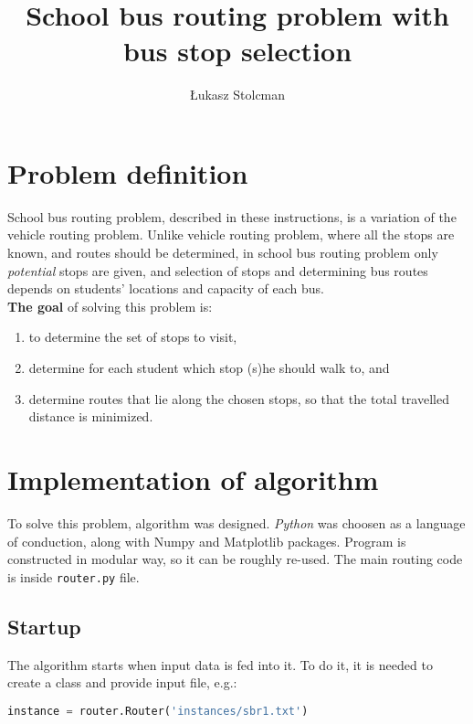 \documentclass [a4paper, 12pt]{article}
\author {Łukasz Stolcman}
\title {School bus routing problem with bus stop selection}
\begin{document}
\maketitle

\section{Problem definition}
School bus routing problem, described in these instructions, is a variation of the vehicle routing problem. Unlike vehicle routing problem, where all the stops are known, and routes should be determined, in school bus routing problem only \textit{potential} stops are given, and selection of stops and determining bus routes depends on students' locations and capacity of each bus.
\bigskip
\\
\textbf{The goal} of solving this problem is:
\begin{enumerate}
    \item to determine the set of stops to visit,
    \item determine for each student which stop (s)he should walk to, and
    \item determine routes that lie along the chosen stops, so that the total travelled distance is minimized.
\end{enumerate}

\section{Implementation of algorithm}
To solve this problem, algorithm was designed. \textit{Python} was choosen as a language of conduction, along with Numpy and Matplotlib packages. Program is constructed in modular way, so it can be roughly re-used. The main routing code is inside \texttt{router.py} file.

\subsection{Startup}
The algorithm starts when input data is fed into it. To do it, it is needed to create a class and provide input file, e.g.:
\begin{lstlisting}[language=Python]
instance = router.Router('instances/sbr1.txt')
\end{lstlisting}
\end{document}
